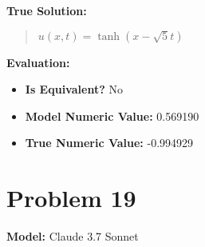 \documentclass{article}
\begin{document}
\textbf{True Solution:}
\begin{quote}
$u(x,t)=\tanh(x-\sqrt{5}t)$
\end{quote}

\textbf{Evaluation:}
\begin{itemize}
\item \textbf{Is Equivalent?} No
\item \textbf{Model Numeric Value:} 0.569190
\item \textbf{True Numeric Value:} -0.994929
\end{itemize}
\vspace{1cm}
\section*{Problem 19}
\textbf{Model:} Claude 3.7 Sonnet
\end{document}
